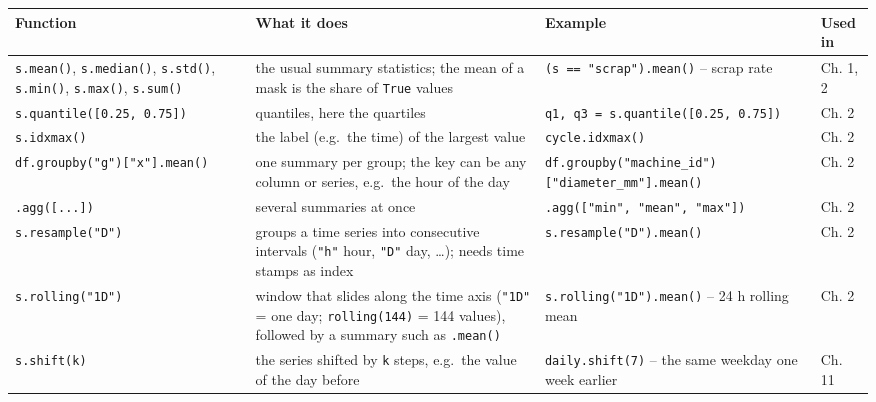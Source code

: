 \documentclass[
  letterpaper,
  DIV=11,
  numbers=noendperiod]{scrreprt}
\begin{document}
\begin{longtable}[]{@{}
  >{\raggedright\arraybackslash}p{}
  >{\raggedright\arraybackslash}p{}
  >{\raggedright\arraybackslash}p{}
  >{\raggedright\arraybackslash}p{}@{}}
\toprule\noalign{}
\begin{minipage}[b]{\linewidth}\raggedright
Function
\end{minipage} & \begin{minipage}[b]{\linewidth}\raggedright
What it does
\end{minipage} & \begin{minipage}[b]{\linewidth}\raggedright
Example
\end{minipage} & \begin{minipage}[b]{\linewidth}\raggedright
Used in
\end{minipage} \\
\midrule\noalign{}
\endhead
\bottomrule\noalign{}
\endlastfoot
\texttt{s.mean()}, \texttt{s.median()}, \texttt{s.std()},
\texttt{s.min()}, \texttt{s.max()}, \texttt{s.sum()} & the usual summary
statistics; the mean of a mask is the share of \texttt{True} values &
\texttt{(s\ ==\ "scrap").mean()} -- scrap rate & Ch. 1, 2 \\
\texttt{s.quantile({[}0.25,\ 0.75{]})} & quantiles, here the quartiles &
\texttt{q1,\ q3\ =\ s.quantile({[}0.25,\ 0.75{]})} & Ch. 2 \\
\texttt{s.idxmax()} & the label (e.g.~the time) of the largest value &
\texttt{cycle.idxmax()} & Ch. 2 \\
\texttt{df.groupby("g"){[}"x"{]}.mean()} & one summary per group; the
key can be any column or series, e.g.~the hour of the day &
\texttt{df.groupby("machine\_id"){[}"diameter\_mm"{]}.mean()} & Ch. 2 \\
\texttt{.agg({[}...{]})} & several summaries at once &
\texttt{.agg({[}"min",\ "mean",\ "max"{]})} & Ch. 2 \\
\texttt{s.resample("D")} & groups a time series into consecutive
intervals (\texttt{"h"} hour, \texttt{"D"} day, \ldots); needs time
stamps as index & \texttt{s.resample("D").mean()} & Ch. 2 \\
\texttt{s.rolling("1D")} & window that slides along the time axis
(\texttt{"1D"} = one day; \texttt{rolling(144)} = 144 values), followed
by a summary such as \texttt{.mean()} & \texttt{s.rolling("1D").mean()}
-- 24 h rolling mean & Ch. 2 \\
\texttt{s.shift(k)} & the series shifted by \texttt{k} steps, e.g.~the
value of the day before & \texttt{daily.shift(7)} -- the same weekday
one week earlier & Ch. 11 \\
\end{longtable}
\end{document}
